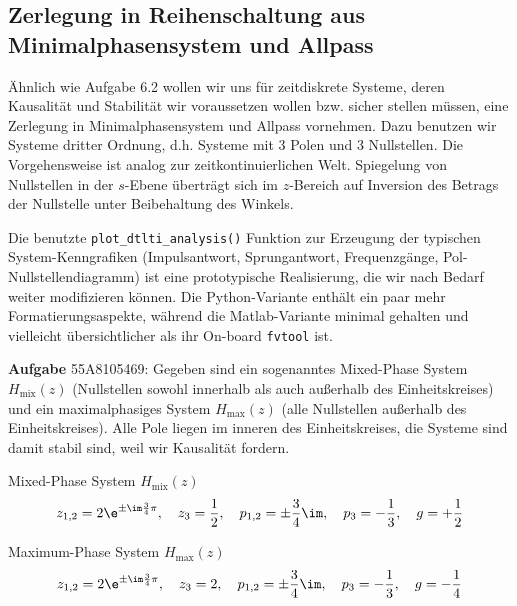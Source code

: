 \subsection{Zerlegung in Reihenschaltung aus Minimalphasensystem und Allpass}
\label{sec:55A8105469}
\begin{Ziel}
Ähnlich wie Aufgabe 6.2 wollen wir uns für zeitdiskrete Systeme, deren
Kausalität und Stabilität wir voraussetzen wollen bzw. sicher stellen müssen,
eine Zerlegung in Minimalphasensystem und Allpass vornehmen. Dazu benutzen
wir Systeme dritter Ordnung, d.h. Systeme
mit 3 Polen und 3 Nullstellen. Die Vorgehensweise
ist analog zur zeitkontinuierlichen Welt. Spiegelung von Nullstellen in
der $s$-Ebene überträgt sich im $z$-Bereich auf
Inversion des Betrags der Nullstelle unter Beibehaltung des
Winkels.
%

Die benutzte \texttt{plot\_dtlti\_analysis()} Funktion zur Erzeugung der
typischen System-Kenngrafiken (Impulsantwort, Sprungantwort, Frequenzgänge,
Pol-Nullstellendiagramm) ist eine prototypische
Realisierung, die wir nach Bedarf weiter modifizieren können. Die Python-Variante
enthält ein paar mehr Formatierungsaspekte, während die Matlab-Variante
minimal gehalten und vielleicht übersichtlicher als ihr On-board
\texttt{fvtool} ist.
%
\end{Ziel}
\textbf{Aufgabe} {\tiny 55A8105469}:
Gegeben sind ein sogenanntes Mixed-Phase System $H_\mathrm{mix}(z)$
(Nullstellen sowohl innerhalb als auch außerhalb des
Einheitskreises) und ein maximalphasiges System $H_\mathrm{max}(z)$
(alle Nullstellen außerhalb des Einheitskreises). Alle Pole liegen im inneren
des Einheitskreises, die Systeme sind damit stabil sind, weil wir Kausalität
fordern.

Mixed-Phase System $H_\mathrm{mix}(z)$
\begin{align}
z_{1,2} = 2 \e^{\pm\im\frac{3}{4}\pi},\quad z_3 = \frac{1}{2},\quad
p_{1,2} = \pm\frac{3}{4}\im,\quad p_3 = -\frac{1}{3},\quad
g = + \frac{1}{2}
\end{align}

Maximum-Phase System $H_\mathrm{max}(z)$
\begin{align}
z_{1,2} = 2 \e^{\pm\im\frac{3}{4}\pi},\quad z_3 = 2,\quad
p_{1,2} = \pm\frac{3}{4}\im,\quad p_3 = -\frac{1}{3},\quad
g = - \frac{1}{4}
\end{align}

